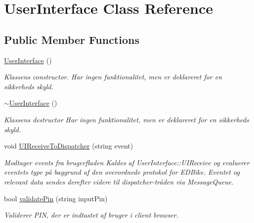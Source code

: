 \hypertarget{classUserInterface}{}\section{User\+Interface Class Reference}
\label{classUserInterface}
\subsection*{Public Member Functions}
\begin{DoxyCompactItemize}
\item 
\mbox{\label{classUserInterface_ae6fb70370701b3bd6120e923df9705b0}} 
\hyperlink{classUserInterface_ae6fb70370701b3bd6120e923df9705b0}{User\+Interface} ()
\begin{DoxyCompactList}\small\item\em Klassens constructor. Har ingen funktionalitet, men er deklareret for en sikkerheds skyld. \end{DoxyCompactList}\item 
\mbox{\label{classUserInterface_ae588b2ff1711a016dd4c6fc5002c0841}} 
\hyperlink{classUserInterface_ae588b2ff1711a016dd4c6fc5002c0841}{$\sim$\+User\+Interface} ()
\begin{DoxyCompactList}\small\item\em Klassens destructor Har ingen funktionalitet, men er deklareret for en sikkerheds skyld. \end{DoxyCompactList}\item 
void \hyperlink{classUserInterface_a5a42468e90a1bbd89f6465ee11d56e93}{U\+I\+Receive\+To\+Dispatcher} (string event)
\begin{DoxyCompactList}\small\item\em Modtager events fra brugerfladen Kaldes af User\+Interface\+::\+U\+I\+Receive og evaluerer eventets type på baggrund af den overordnede protokol for E\+D\+Bike. Eventet og relevant data sendes derefter videre til dispatcher-\/tråden via Message\+Queue. \end{DoxyCompactList}\item 
bool \hyperlink{classUserInterface_a899642cb1d73de5804ac8b56d92ca94c}{validate\+Pin} (string input\+Pin)
\begin{DoxyCompactList}\small\item\em Validerer P\+IN, der er indtastet af bruger i client browser. \end{DoxyCompactList}\item 

\end{DoxyCompactItemize}
